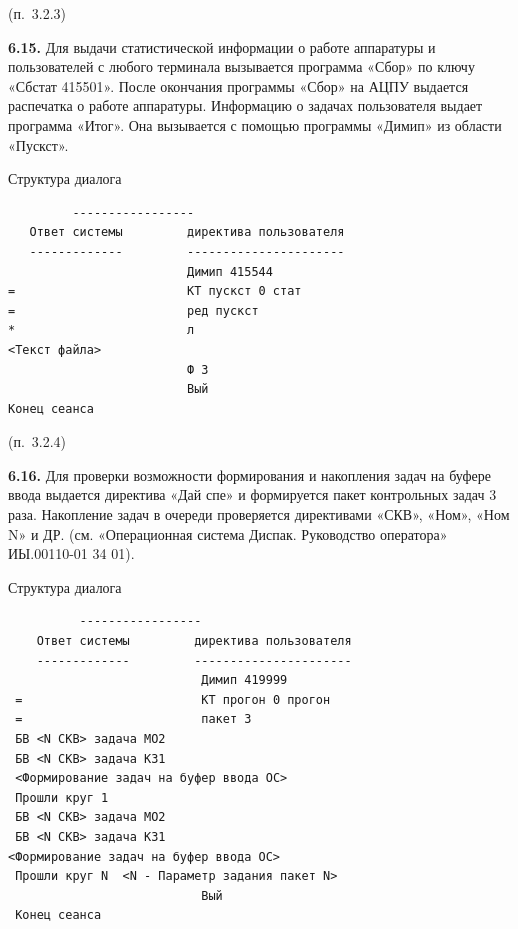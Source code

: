 \documentclass[11pt,a4paper]{article}
\begin{document}
\begin{center}(п.~3.2.3)\end{center}
\par\textbf{6.15.} Для выдачи статистической информации о работе аппаратуры и пользователей с любого терминала вызывается программа «Сбор» по ключу «Сбстат 415501». После окончания программы «Сбор» на АЦПУ выдается распечатка о работе аппаратуры. Информацию о задачах пользователя выдает программа «Итог». Она вызывается с помощью программы «Димип» из области «Пускст».\par
\begin{center}Структура диалога\end{center}
\begin{center}\small
\begin{BVerbatim}
         -----------------
   Ответ системы         директива пользователя
   -------------         ----------------------
                         Димип 415544
=                        КТ пускст 0 стат
=                        ред пускст
*                        л
<Текст файла>
                         Ф 3
                         Вый
Конец сеанса
\end{BVerbatim}
\end{center}

\begin{center}(п.~3.2.4)\end{center}
\par\textbf{6.16.} Для проверки возможности формирования и накопления задач на буфере ввода выдается директива «Дай спе» и формируется пакет контрольных задач 3 раза. Накопление задач в очереди проверяется директивами «СКВ», «Ном», «Ном N» и ДР. (см. «Операционная система Диспак. Руководство оператора» ИЫ.00110-01 34 01).\par
\begin{center}Структура диалога\end{center}
\begin{center}\small
\begin{BVerbatim}
          -----------------
    Ответ системы         директива пользователя
    -------------         ----------------------
                           Димип 419999
 =                         КТ прогон 0 прогон
 =                         пакет 3
 БВ <N СКВ> задача МО2
 БВ <N СКВ> задача КЗ1
 <Формирование задач на буфер ввода ОС>
 Прошли круг 1
 БВ <N СКВ> задача МО2
 БВ <N СКВ> задача КЗ1
<Формирование задач на буфер ввода ОС>
 Прошли круг N  <N - Параметр задания пакет N>
                           Вый
 Конец сеанса
\end{BVerbatim}
\end{center}
\end{document}
